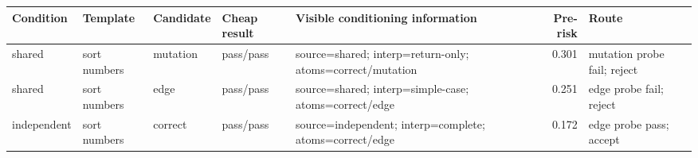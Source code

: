 \begin{tabular}{@{}lllllrl@{}}
\toprule
Condition & Template & Candidate & Cheap result & Visible conditioning information & Pre-risk & Route\\
\midrule
shared & sort numbers & mutation & pass/pass & source=shared; interp=return-only; atoms=correct/mutation & 0.301 & mutation probe fail; reject\\
shared & sort numbers & edge & pass/pass & source=shared; interp=simple-case; atoms=correct/edge & 0.251 & edge probe fail; reject\\
independent & sort numbers & correct & pass/pass & source=independent; interp=complete; atoms=correct/edge & 0.172 & edge probe pass; accept\\
\bottomrule
\end{tabular}
